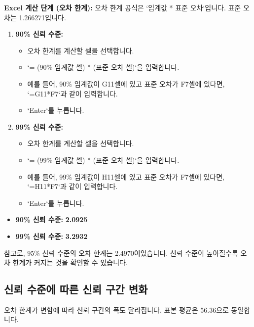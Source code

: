 \documentclass[11pt,a4paper]{article}
\begin{document}
\textbf{Excel 계산 단계 (오차 한계):}
오차 한계 공식은 `임계값 * 표준 오차`입니다. 표준 오차는 1.266271입니다.

\begin{enumerate}
    \item \textbf{90\% 신뢰 수준:}
        \begin{itemize}
            \item 오차 한계를 계산할 셀을 선택합니다.
            \item `= (90\% 임계값 셀) * (표준 오차 셀)`을 입력합니다.
            \item 예를 들어, 90\% 임계값이 G11셀에 있고 표준 오차가 F7셀에 있다면, `=G11*F7`과 같이 입력합니다.
            \item `Enter`를 누릅니다.
        \end{itemize}
    \item \textbf{99\% 신뢰 수준:}
        \begin{itemize}
            \item 오차 한계를 계산할 셀을 선택합니다.
            \item `= (99\% 임계값 셀) * (표준 오차 셀)`을 입력합니다.
            \item 예를 들어, 99\% 임계값이 H11셀에 있고 표준 오차가 F7셀에 있다면, `=H11*F7`과 같이 입력합니다.
            \item `Enter`를 누릅니다.
        \end{itemize}
\end{enumerate}
\begin{tcolorbox}[colback=mygreen!10!white, colframe=mygreen!75!black, title=계산 결과: 신뢰 수준별 오차 한계]
\begin{itemize}
    \item \textbf{90\% 신뢰 수준:} \textbf{2.0925}
    \item \textbf{99\% 신뢰 수준:} \textbf{3.2932}
\end{itemize}
참고로, 95\% 신뢰 수준의 오차 한계는 2.4970이었습니다. 신뢰 수준이 높아질수록 오차 한계가 커지는 것을 확인할 수 있습니다.
\end{tcolorbox}

\subsection{신뢰 수준에 따른 신뢰 구간 변화}

오차 한계가 변함에 따라 신뢰 구간의 폭도 달라집니다. 표본 평균은 56.36으로 동일합니다.
\end{document}
